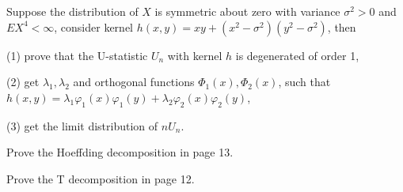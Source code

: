 \begin{problem}
    Suppose the distribution of $X$ is symmetric about zero with variance $\sigma^2>0$ and $EX^4 < \infty$, consider kernel $h(x,y)=xy+(x^2-\sigma^2)(y^2-\sigma^2)$, then

(1) prove that the U-statistic $U_n$ with kernel $h$ is degenerated of order 1,

(2) get $\lambda_1, \lambda_2$ and orthogonal functions $\Phi_1(x), \Phi_2(x)$, such that $h(x,y)=\lambda_1\varphi_1(x)\varphi_1(y)+\lambda_2\varphi_2(x)\varphi_2(y)$,

(3) get the limit distribution of $n U_n$.
\end{problem}


\begin{solution}
    
\end{solution}




\begin{problem}
    Prove the Hoeffding decomposition in page 13.
\end{problem}


\begin{solution}
    
\end{solution}




\begin{problem}
    Prove the T decomposition in page 12.
\end{problem}


\begin{solution}
    
\end{solution}




